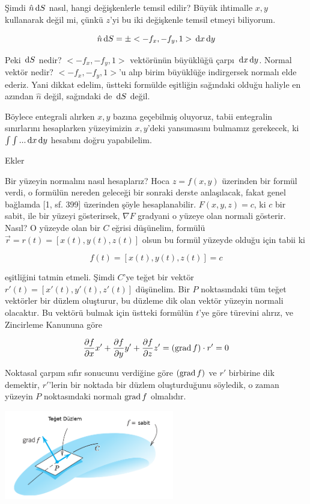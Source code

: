 \documentclass[12pt,fleqn]{article}\usepackage{../../common}
\begin{document}
Şimdi $\hat{n} \,\mathrm{d} S$ nasıl, hangi değişkenlerle temsil edilir? Büyük ihtimalle
$x,y$ kullanarak değil mi, çünkü $z$'yi bu iki değişkenle temsil etmeyi
biliyorum.

$$
\hat{n} \,\mathrm{d} S = \pm < -f_x, -f_y, 1 > \,\mathrm{d} x \,\mathrm{d} y
$$

Peki $\,\mathrm{d} S$ nedir? $< -f_x, -f_y, 1 >$ vektörünün büyüklüğü çarpı $\,\mathrm{d} x \,\mathrm{d} y$.
Normal vektör nedir? $< -f_x, -f_y, 1 >$'u alıp birim büyüklüğe indirgersek
normalı elde ederiz. Yani dikkat edelim, üstteki formülde eşitliğin sağındaki
olduğu haliyle en azından $\hat{n}$ değil, sağındaki de $\,\mathrm{d} S$ değil.

Böylece entegrali alırken $x,y$ bazına geçebilmiş oluyoruz, tabii entegralin
sınırlarını hesaplarken yüzeyimizin $x,y$'deki yansımasını bulmamız gerekecek,
ki $\int \int ... \,\mathrm{d} x \,\mathrm{d} y$ hesabını doğru yapabilelim.

Ekler

Bir yüzeyin normalını nasıl hesaplarız? Hoca $z = f(x,y)$ üzerinden bir formül
verdi, o formülün nereden geleceği bir sonraki derste anlaşılacak, fakat genel
bağlamda [1, sf. 399] üzerinden şöyle hesaplanabilir. $F(x,y,z) = c$, ki $c$ bir
sabit, ile bir yüzeyi gösterirsek, $\nabla F$ gradyani o yüzeye olan normali
gösterir. Nasıl? O yüzeyde olan bir $C$ eğrisi düşünelim, formülü $\vec{r} =
r(t) = [x(t),y(t),z(t)]$ olsun bu formül yüzeyde olduğu için tabii ki

$$
f(t) = [x(t),y(t),z(t)] = c
$$

eşitliğini tatmin etmeli. Şimdi $C$'ye teğet bir vektör $r'(t) =
[x'(t),y'(t),z'(t)]$ düşünelim. Bir $P$ noktasındaki tüm teğet vektörler bir
düzlem oluşturur, bu düzleme dik olan vektör yüzeyin normali olacaktır. Bu
vektörü bulmak için üstteki formülün $t$'ye göre türevini alırız, ve Zincirleme
Kanununa göre

$$
\frac{\partial f}{\partial x} x' + 
\frac{\partial f}{\partial y} y' + 
\frac{\partial f}{\partial z} z'  = (\operatorname{grad} f) \cdot r' = 0
$$

Noktasal çarpım sıfır sonucunu verdiğine göre $(\operatorname{grad} f)$ ve $r'$ birbirine dik
demektir, $r'$'lerin bir noktada bir düzlem oluşturduğunu söyledik, o zaman
yüzeyin $P$ noktasındaki normalı $\operatorname{grad} f$ olmalıdır.

\includegraphics[width=20em]{calc_multi_27_10.png}
\end{document}
